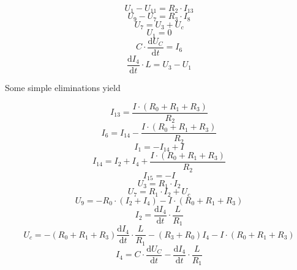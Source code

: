 \documentclass[10pt,a4paper]{article}
\begin{document}
\begin{equation*}
  U_{1} - U_{11} = R_{2} \cdot I_{13}
\end{equation*}
\begin{equation*}
  U_{9} - U_{7} = R_{3} \cdot I_{8}
\end{equation*}
\begin{equation*}
  U_{7} = U_{3} + U_{c}
\end{equation*}
\begin{equation*}
  U_{1} = 0
\end{equation*}
\begin{equation*}
  C \cdot \frac{\text{d}U_{C}}{\text{d}t} = I_{6}
\end{equation*}
\begin{equation*}
  \frac{\text{d}I_{4}}{\text{d}t} \cdot L = U_{3} - U_{1}
\end{equation*}

Some simple eliminations yield

\begin{equation*}
  I_{13} = \frac{I \cdot (R_{0} + R_{1} + R_{3})}{R_{2}}
\end{equation*}
\begin{equation*}
  I_{6} = I_{14} - \frac{I \cdot (R_{0} + R_{1} + R_{3})}{R_{2}}
\end{equation*}
\begin{equation*}
  I_{1} = -I_{14} + I
\end{equation*}
\vspace{2em}
\begin{equation*}
  I_{14} = I_{2} + I_{4} + \frac{I \cdot (R_{0} + R_{1} + R_{3})}{R_{2}}
\end{equation*}
\begin{equation*}
  I_{15} = -I
\end{equation*}
\begin{equation*}
  U_{3} = R_{1} \cdot I_{2}
\end{equation*}
\begin{equation*}
  U_{7} = R_{1} \cdot I_{2} + U_{c}
\end{equation*}
\begin{equation*}
  U_{9} = -R_{0} \cdot \left( I_{2} + I_{4} \right) - I \cdot (R_{0} + R_{1} + R_{3})
\end{equation*}
\begin{equation*}
  I_{2} = \frac{\text{d}I_{4}}{\text{d}t} \cdot \frac{L}{R_{1}}
\end{equation*}
\begin{equation*}
  U_{c} = -\left( R_{0} + R_{1} + R_{3} \right)\frac{\text{d}I_{4}}{\text{d}t} \cdot \frac{L}{R_{1}} - \left( R_{3} + R_{0} \right)I_{4} - I \cdot (R_{0} + R_{1} + R_{3})
\end{equation*}
\begin{equation*}
  I_{4} = C \cdot \frac{\text{d}U_{C}}{\text{d}t} - \frac{\text{d}I_{4}}{\text{d}t} \cdot \frac{L}{R_{1}}
\end{equation*}
\end{document}
